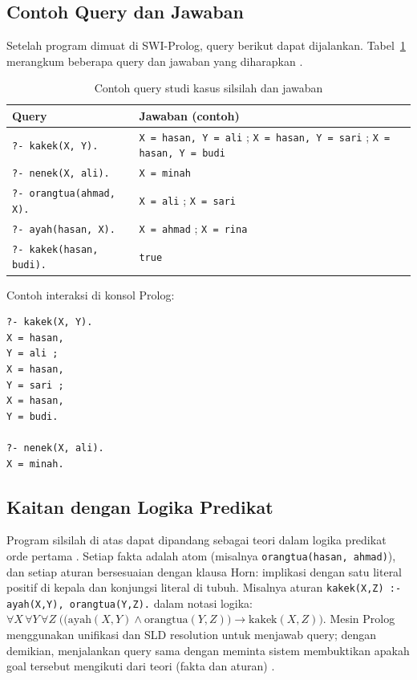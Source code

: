 \subsection{Contoh Query dan Jawaban}

Setelah program dimuat di SWI-Prolog, query berikut dapat dijalankan. Tabel~\ref{tab:studi-kasus-query} merangkum beberapa query dan jawaban yang diharapkan \cite{learn_prolog,swi_manual}.

\begin{table}[htbp]
\centering
\small
\begin{tabular}{|>{\raggedright\arraybackslash}p{4.2cm}|>{\raggedright\arraybackslash}p{6cm}|}
\hline
\textbf{Query} & \textbf{Jawaban (contoh)} \\
\hline
\texttt{?- kakek(X, Y).} & \texttt{X = hasan, Y = ali} ; \texttt{X = hasan, Y = sari} ; \texttt{X = hasan, Y = budi} \\
\hline
\texttt{?- nenek(X, ali).} & \texttt{X = minah} \\
\hline
\texttt{?- orangtua(ahmad, X).} & \texttt{X = ali} ; \texttt{X = sari} \\
\hline
\texttt{?- ayah(hasan, X).} & \texttt{X = ahmad} ; \texttt{X = rina} \\
\hline
\texttt{?- kakek(hasan, budi).} & \texttt{true} \\
\hline
\end{tabular}
\caption{Contoh query studi kasus silsilah dan jawaban \cite{learn_prolog}}
\label{tab:studi-kasus-query}
\end{table}

Contoh interaksi di konsol Prolog:

\begin{lstlisting}[style=prologstyle, caption={Contoh menjalankan query silsilah}]
?- kakek(X, Y).
X = hasan,
Y = ali ;
X = hasan,
Y = sari ;
X = hasan,
Y = budi.

?- nenek(X, ali).
X = minah.
\end{lstlisting}

\subsection{Kaitan dengan Logika Predikat}

Program silsilah di atas dapat dipandang sebagai teori dalam logika predikat orde pertama \cite{olp_fol,berkeley_fol}. Setiap fakta adalah atom (misalnya \texttt{orangtua(hasan, ahmad)}), dan setiap aturan bersesuaian dengan klausa Horn: implikasi dengan satu literal positif di kepala dan konjungsi literal di tubuh. Misalnya aturan \texttt{kakek(X,Z) :- ayah(X,Y), orangtua(Y,Z).} dalam notasi logika: $\forall X\,\forall Y\,\forall Z\;\big(\big(\mathrm{ayah}(X,Y) \wedge \mathrm{orangtua}(Y,Z)\big) \rightarrow \mathrm{kakek}(X,Z)\big)$. Mesin Prolog menggunakan unifikasi dan SLD resolution untuk menjawab query; dengan demikian, menjalankan query sama dengan meminta sistem membuktikan apakah goal tersebut mengikuti dari teori (fakta dan aturan) \cite{learn_prolog,lpn_unification}.

